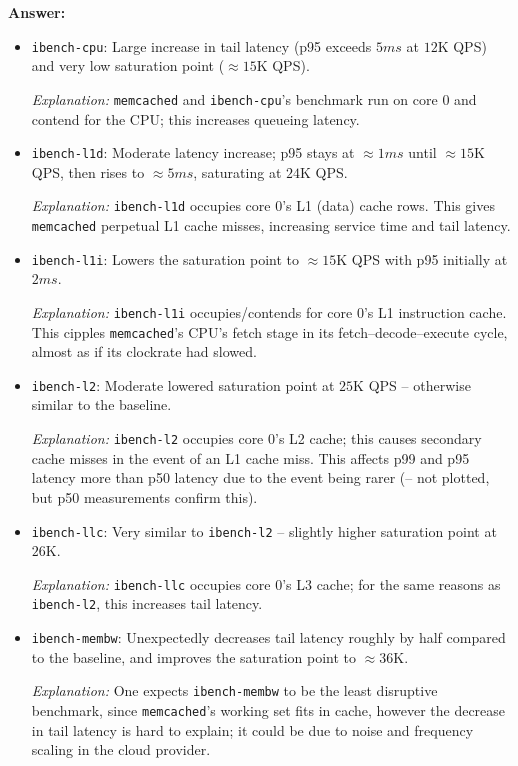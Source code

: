 \textbf{Answer:}
\begin{itemize}
    \item \texttt{ibench-cpu}: Large increase in tail latency (p95 exceeds $5ms$ at $12$K QPS) and very low saturation point ($\approx 15$K QPS).
    
    \textit{Explanation:} \texttt{memcached} and \texttt{ibench-cpu}'s benchmark run on core 0 and contend for the CPU; this increases queueing latency.
    
    \item \texttt{ibench-l1d}: Moderate latency increase; p95 stays at $\approx 1ms$ until $\approx 15$K QPS, then rises to $\approx 5ms$, saturating at $24$K QPS.
    
    \textit{Explanation:} \texttt{ibench-l1d} occupies core 0's L1 (data) cache rows. This gives \texttt{memcached} perpetual L1 cache misses, increasing service time and tail latency.

    \item \texttt{ibench-l1i}: Lowers the saturation point to $\approx 15$K QPS with p95 initially at $2ms$.
    
    \textit{Explanation:} \texttt{ibench-l1i} occupies/contends for core 0's L1 instruction cache. This cipples \texttt{memcached}'s CPU's fetch stage in its fetch–decode–execute cycle, almost as if its clockrate had slowed.

    \item \texttt{ibench-l2}: Moderate lowered saturation point at $25$K QPS – otherwise similar to the baseline.
    
    \textit{Explanation:} \texttt{ibench-l2} occupies core 0's L2 cache; this causes secondary cache misses in the event of an L1 cache miss. This affects p99 and p95 latency more than p50 latency due to the event being rarer (– not plotted, but p50 measurements confirm this).

    \item \texttt{ibench-llc}: Very similar to \texttt{ibench-l2} – slightly higher saturation point at $26$K.
    
    \textit{Explanation:} \texttt{ibench-llc} occupies core 0's L3 cache; for the same reasons as \texttt{ibench-l2}, this increases tail latency. 

    \item \texttt{ibench-membw}: Unexpectedly decreases tail latency roughly by half compared to the baseline, and improves the saturation point to $\approx 36$K. 
    
    \textit{Explanation:} One expects \texttt{ibench-membw} to be the least disruptive benchmark, since \texttt{memcached}'s working set fits in cache, however the decrease in tail latency is hard to explain; it could be due to noise and frequency scaling in the cloud provider.
\end{itemize}


